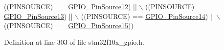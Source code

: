 \begin{DoxyCode}
                                       ((PINSOURCE) == \hyperlink{group___g_p_i_o___pin__sources_gaaa64892c00d50b0fa49f0ce72a83e6e0}{GPIO\_PinSource12}) || \(\backslash\)
                                       ((PINSOURCE) == \hyperlink{group___g_p_i_o___pin__sources_gace4beb385facd306324fa9e362df5fda}{GPIO\_PinSource13}) || \(\backslash\)
                                       ((PINSOURCE) == \hyperlink{group___g_p_i_o___pin__sources_ga5fbb540a86af4015a46ac16c61ddb1f7}{GPIO\_PinSource14}) || \(\backslash\)
                                       ((PINSOURCE) == \hyperlink{group___g_p_i_o___pin__sources_ga9b29d9a9ecb1579ecedf4ea53ccbfd5b}{GPIO\_PinSource15}))
\end{DoxyCode}


Definition at line 303 of file stm32f10x\+\_\+gpio.\+h.

